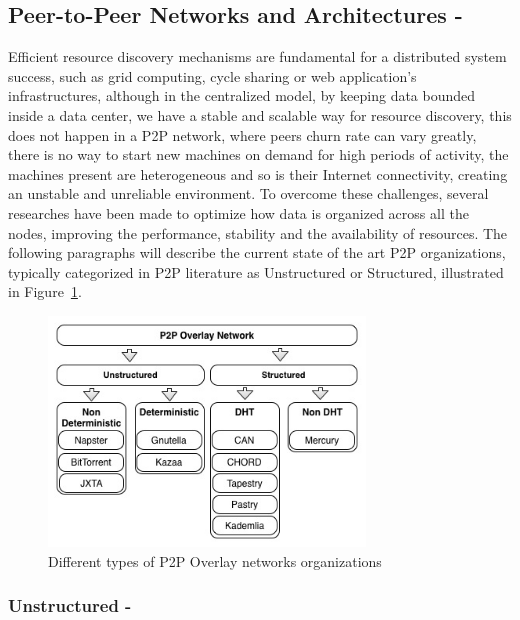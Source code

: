 \subsection{Peer-to-Peer Networks and Architectures -}  
Efficient resource discovery mechanisms are fundamental for a distributed system success, such as grid computing, cycle sharing or web application's infrastructures\cite{Ranjan2006}, although in the centralized model, by keeping data bounded inside a data center, we have a stable and scalable way for resource discovery, this does not happen in a P2P network, where peers churn rate can vary greatly, there is no way to start new machines on demand for high periods of activity, the machines present are heterogeneous and so is their Internet connectivity, creating an unstable and unreliable environment. To overcome these challenges, several researches have been made to optimize how data is organized across all the nodes, improving the performance, stability and the availability of resources. The following paragraphs will describe the current state of the art P2P organizations, typically categorized in P2P literature as Unstructured or Structured\cite{Milojicic2003}, illustrated in Figure~\ref{fig:Different types of P2P Overlay networks organizations}.

\begin{figure}[bh!]
  \begin{center}
    \includegraphics[width=0.75\textwidth]{./img/p2porganizations.jpg}
  \end{center}
  \caption{Different types of P2P Overlay networks organizations}
  \label{fig:Different types of P2P Overlay networks organizations}
\end{figure}


\subsubsection{\textbf{Unstructured -}}\label{par:Unstructured}

